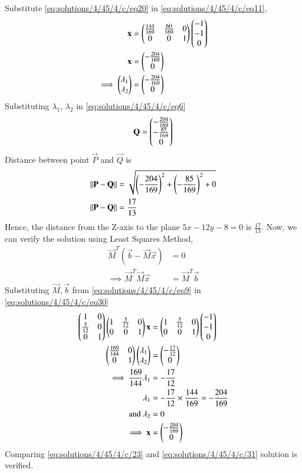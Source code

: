 Substitute \eqref{eq:solutions/4/45/4/c/eq20} in \eqref{eq:solutions/4/45/4/c/eq11},
\begin{align}\label{eq:solutions/4/45/4/c/23}
	\mathbf{x} &= \begin{pmatrix}\frac{144}{169} & \frac{60}{169} & 0\\0 & 0 & 1\end{pmatrix}\begin{pmatrix}-1\\-1\\0\end{pmatrix} \\
	\mathbf{x} &= \begin{pmatrix}-\frac{204}{169}\\0\end{pmatrix} \\
	\implies\begin{pmatrix}\lambda_1 \\ \lambda_2\end{pmatrix} &= \begin{pmatrix}-\frac{204}{169}\\0\end{pmatrix}
\end{align}
Substituting $\lambda_1$, $\lambda_2$ in \eqref{eq:solutions/4/45/4/c/eq6}
\begin{equation}
	\mathbf{Q} = \begin{pmatrix}-\frac{204}{169}\\-\frac{85}{169}\\0\end{pmatrix}
\end{equation}
Distance between point $\vec{P}$ and $\vec{Q}$ is
\begin{align}
	\left\lVert\mathbf{P}-\mathbf{Q}\right\rVert &= \sqrt{\left(-\frac{204}{169}\right)^2 +\left(-\frac{85}{169}\right)^2 + 0}\\
	\left\lVert\mathbf{P}-\mathbf{Q}\right\rVert &= \frac{17}{13} 
\end{align}
Hence, the distance from the Z-axis to the plane $5x - 12y - 8 = 0$ is $\frac{17}{13}$. Now, we can verify the solution using Least Squares Method,
\begin{align}
	\vec{M}^T(\vec{b} - \vec{M}\vec{x}) &= 0\\
	\label{eq:solutions/4/45/4/c/eq30}\implies \vec{M}^T\vec{M}\vec{x} &= \vec{M}^T\vec{b}
\end{align}
Substituting $\vec{M}, \vec{b}$ from \eqref{eq:solutions/4/45/4/c/eq9} in \eqref{eq:solutions/4/45/4/c/eq30}
\begin{align}
	\begin{pmatrix}1 & 0\\\frac{5}{12} & 0\\0 & 1\end{pmatrix}\begin{pmatrix}1 & \frac{5}{12} & 0\\0 & 0 & 1\end{pmatrix}\mathbf{x} &= \begin{pmatrix}1 & \frac{5}{12} & 0\\0 & 0 & 1\end{pmatrix}\begin{pmatrix}-1\\-1\\0\end{pmatrix}\\
	\begin{pmatrix}\frac{169}{144} & 0\\0 & 1\end{pmatrix}\begin{pmatrix}\lambda_1\\\lambda_2\end{pmatrix} &= \begin{pmatrix}-\frac{17}{12}\\0\end{pmatrix}\\
	\implies\frac{169}{144}\lambda_1 &= -\frac{17}{12}\\
	\lambda_1 &= -\frac{17}{12} \times \frac{144}{169} = -\frac{204}{169}\\
	\text{and }\lambda_2 &= 0\\
	\label{eq:solutions/4/45/4/c/31}\implies\mathbf{x} &= \begin{pmatrix}-\frac{204}{169}\\0\end{pmatrix}
\end{align}
Comparing \eqref{eq:solutions/4/45/4/c/23} and \eqref{eq:solutions/4/45/4/c/31} solution is verified.
